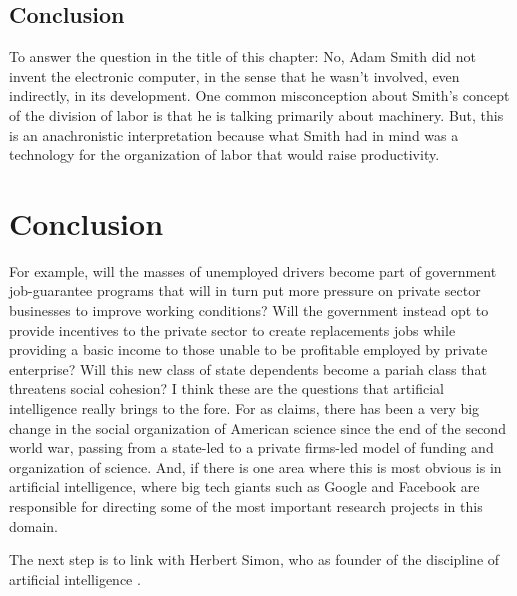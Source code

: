 \documentclass[version=last,draft=false,paper=A4,portrait,twoside=true,twocolumn=false,headinclude=false,footinclude=false,mpinclude=true,fontsize=12,BCOR=20mm,DIV=calc,pagesize=auto,open=right,chapterprefix=true,numbers=autoendperiod,headsepline=false,headings=twolinechapter,parskip=false]{scrbook}
\begin{document}
\section{Conclusion}
\label{sec:org7207ad7}

To answer the question in the title of this chapter: No, Adam Smith did not
invent the electronic computer, in the sense that he wasn't involved, even
indirectly, in its development. One common misconception about Smith's
concept of the division of labor is that he is talking primarily about
machinery. But, this is an anachronistic interpretation because what Smith
had in mind was a technology for the organization of labor that would raise
productivity.  


\chapter{Conclusion}
\label{sec:orgc993d40}

For example, will the masses of unemployed drivers become part of
government job-guarantee programs \cite{wray1998_2003} that will in turn put
more pressure on private sector businesses to improve working conditions?
Will the government instead opt to provide incentives to the private sector
to create replacements jobs while providing a basic income to those unable
to be profitable employed by private enterprise? Will this new class of
state dependents become a pariah class that threatens social cohesion? I
think these are the questions that artificial intelligence really brings to
the fore. For as \textcite{mirowski2011} claims, there has been a very big
change in the social organization of American science since the end of the
second world war, passing from a state-led to a private firms-led model of
funding and organization of science. And, if there is one area where this
is most obvious is in artificial intelligence, where big tech giants such
as Google and Facebook are responsible for directing some of the most
important research projects in this domain.

The next step is to link with Herbert Simon, who as founder of the
discipline  of  artificial intelligence . 



\printbibliography[title=References]
\end{document}

